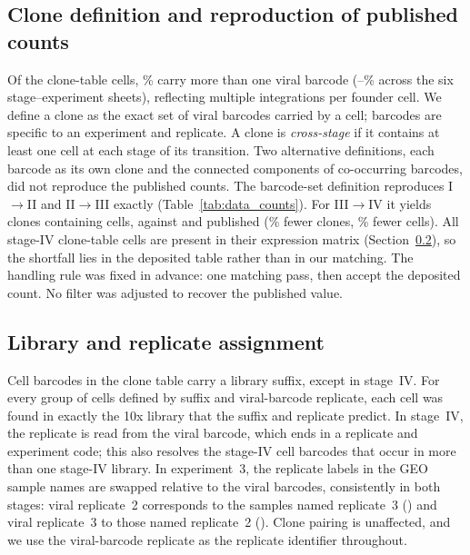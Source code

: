 \subsection{Clone definition and reproduction of published counts}
Of the clone-table cells, \pctMultiBarcode\% carry more than one viral barcode
(\pctMultiBarcodeMin--\pctMultiBarcodeMax\% across the six stage--experiment sheets),
reflecting multiple integrations per founder cell. We define a clone as the exact set of
viral barcodes carried by a cell; barcodes are specific to an experiment and replicate.
A clone is \emph{cross-stage} if it contains at least one cell at each stage of its
transition. Two alternative definitions, each barcode as its own clone and the
connected components of co-occurring barcodes, did not reproduce the published counts.
The barcode-set definition reproduces I$\to$II and II$\to$III exactly
(Table~\ref{tab:data_counts}). For III$\to$IV it yields \nExpThreeClones{} clones
containing \nExpThreeCells{} cells, against \nExpThreePubClones{} and
\nExpThreePubCells{} published (\pctExpThreeCloneGap\% fewer clones,
\pctExpThreeCellGap\% fewer cells). All \nStageIVCells{} stage-IV clone-table cells are
present in their expression matrix (Section~\ref{sec:data_libs}), so the shortfall lies in
the deposited table rather than in our matching. The handling rule was fixed in advance:
one matching pass, then accept the deposited count. No filter was adjusted to recover
the published value.

\subsection{Library and replicate assignment}\label{sec:data_libs}
Cell barcodes in the clone table carry a library suffix, except in stage~IV. For every
group of cells defined by suffix and viral-barcode replicate, each cell was found in
exactly the 10x library that the suffix and replicate predict. In stage~IV, the
replicate is read from the viral barcode, which ends in a replicate and experiment
code; this also resolves the \nStageIVCollisions{} stage-IV cell barcodes that occur in
more than one stage-IV library. In experiment~3, the replicate labels in the GEO sample
names are swapped relative to the viral barcodes, consistently in both stages: viral
replicate~2 corresponds to the samples named replicate~3 (\swapRepTwoGSM) and viral
replicate~3 to those named replicate~2 (\swapRepThreeGSM). Clone pairing is unaffected,
and we use the viral-barcode replicate as the replicate identifier throughout.

